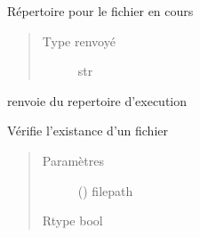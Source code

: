 \documentclass[letterpaper,10pt,french]{sphinxmanual}
\begin{document}

\begin{fulllineitems}
\label{\detokenize{modules/tools:toolbox.tools.dir_projet}}
Répertoire pour le fichier en cours
\begin{quote}\begin{description}
\item[{Type renvoyé}] \leavevmode
str

\end{description}\end{quote}

\end{fulllineitems}


\begin{fulllineitems}
\label{\detokenize{modules/tools:toolbox.tools.dir_worked}}
renvoie du repertoire d’execution

\end{fulllineitems}


\begin{fulllineitems}
\label{\detokenize{modules/tools:toolbox.tools.file_exists}}
Vérifie l’existance d’un fichier
\begin{quote}\begin{description}
\item[{Paramètres}] \leavevmode
{} () \textendash{} filepath

\item[{Rtype bool}] \leavevmode
\end{description}\end{quote}

\end{fulllineitems}

\end{document}
